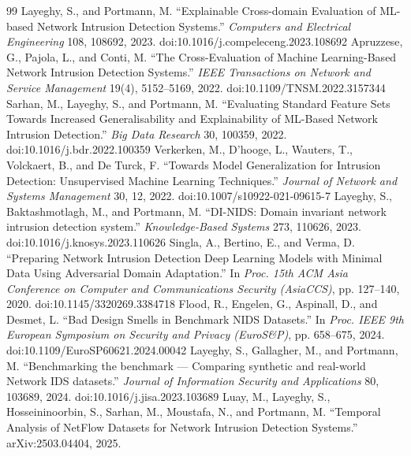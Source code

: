 \documentclass[preprint,12pt,nopreprintline]{elsarticle}
\begin{document}
\begin{thebibliography}{99}
 Layeghy, S., and Portmann, M. ``Explainable Cross-domain Evaluation of ML-based Network Intrusion Detection Systems.'' \emph{Computers and Electrical Engineering} 108, 108692, 2023. doi:10.1016/j.compeleceng.2023.108692
 Apruzzese, G., Pajola, L., and Conti, M. ``The Cross-Evaluation of Machine Learning-Based Network Intrusion Detection Systems.'' \emph{IEEE Transactions on Network and Service Management} 19(4), 5152--5169, 2022. doi:10.1109/TNSM.2022.3157344
 Sarhan, M., Layeghy, S., and Portmann, M. ``Evaluating Standard Feature Sets Towards Increased Generalisability and Explainability of ML-Based Network Intrusion Detection.'' \emph{Big Data Research} 30, 100359, 2022. doi:10.1016/j.bdr.2022.100359
 Verkerken, M., D'hooge, L., Wauters, T., Volckaert, B., and De Turck, F. ``Towards Model Generalization for Intrusion Detection: Unsupervised Machine Learning Techniques.'' \emph{Journal of Network and Systems Management} 30, 12, 2022. doi:10.1007/s10922-021-09615-7
 Layeghy, S., Baktashmotlagh, M., and Portmann, M. ``DI-NIDS: Domain invariant network intrusion detection system.'' \emph{Knowledge-Based Systems} 273, 110626, 2023. doi:10.1016/j.knosys.2023.110626
 Singla, A., Bertino, E., and Verma, D. ``Preparing Network Intrusion Detection Deep Learning Models with Minimal Data Using Adversarial Domain Adaptation.'' In \emph{Proc. 15th ACM Asia Conference on Computer and Communications Security (AsiaCCS)}, pp. 127--140, 2020. doi:10.1145/3320269.3384718
 Flood, R., Engelen, G., Aspinall, D., and Desmet, L. ``Bad Design Smells in Benchmark NIDS Datasets.'' In \emph{Proc. IEEE 9th European Symposium on Security and Privacy (EuroS\&P)}, pp. 658--675, 2024. doi:10.1109/EuroSP60621.2024.00042
 Layeghy, S., Gallagher, M., and Portmann, M. ``Benchmarking the benchmark --- Comparing synthetic and real-world Network IDS datasets.'' \emph{Journal of Information Security and Applications} 80, 103689, 2024. doi:10.1016/j.jisa.2023.103689
 Luay, M., Layeghy, S., Hosseininoorbin, S., Sarhan, M., Moustafa, N., and Portmann, M. ``Temporal Analysis of NetFlow Datasets for Network Intrusion Detection Systems.'' arXiv:2503.04404, 2025.
\end{thebibliography}
\end{document}
